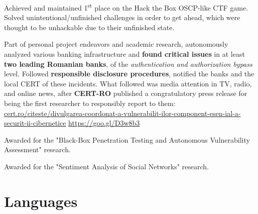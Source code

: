 \documentclass[11pt,a4paper,sans]{moderncv}
\renewcommand*{\httplink}[2][]{%
	\ifthenelse{\equal{#1}{}}%
	{\href{https://#2}{#2}}%
	{\href{https://#2}{#1}}}
\begin{document}
	\vspace{-2pt} {\small{Achieved and maintained 1\textsuperscript{st} place on the Hack the Box OSCP-like CTF game. Solved unintentional/unfinished challenges in order to get ahead, which were thought to be unhackable due to their unfinished state.}}

	\vspace{4pt}

	\vspace{-2pt} {\small{Part of personal project endeavors and academic research, autonomously analyzed various banking infrastructure and \textbf{found critical issues} in at least \textbf{two leading Romanian banks}, of the \textit{authentication and authorization bypass} level. Followed \textbf{responsible disclosure procedures}, notified the banks and the local CERT of these incidents. What followed was media attention in TV, radio, and online news, after \textbf{CERT-RO} published a congratulatory press release for being the first researcher to responsibly report to them: \httplink[https://goo.gl/D3w8b3]{cert.ro/citeste/divulgarea-coordonat-a-vulnerabilit-ilor-component-esen-ial-a-securit-ii-cibernetice}}}

	\vspace{4pt}

	\vspace{-2pt} {\small{Awarded for the "Black-Box Penetration Testing and Autonomous Vulnerability Assessment" research.}}

	\vspace{4pt}

	\vspace{-2pt} {\small{Awarded for the "Sentiment Analysis of Social Networks" research.}}

\section{Languages}


\fancyfoot[L]{\textcolor{color2}{\phonesymbol \myphone {~~~{\rmfamily\textbullet}~~~} \emailsymbol\emaillink{\myemail} {~~~{\rmfamily\textbullet}~~~} \homepagesymbol\httplink{\myhomepage}}}
\end{document}
